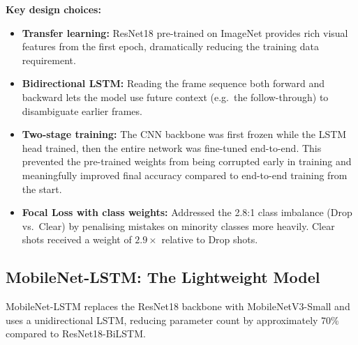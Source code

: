 \documentclass[11pt,a4paper]{article}
\begin{document}
\textbf{Key design choices:}
\begin{itemize}
  \item \textbf{Transfer learning:} ResNet18 pre-trained on ImageNet provides rich visual features from the first epoch, dramatically reducing the training data requirement.
  \item \textbf{Bidirectional LSTM:} Reading the frame sequence both forward and backward lets the model use future context (e.g.\ the follow-through) to disambiguate earlier frames.
  \item \textbf{Two-stage training:} The CNN backbone was first frozen while the LSTM head trained, then the entire network was fine-tuned end-to-end. This prevented the pre-trained weights from being corrupted early in training and meaningfully improved final accuracy compared to end-to-end training from the start.
  \item \textbf{Focal Loss with class weights:} Addressed the 2.8:1 class imbalance (Drop vs.\ Clear) by penalising mistakes on minority classes more heavily. Clear shots received a weight of $2.9\times$ relative to Drop shots.
\end{itemize}

\subsection{MobileNet-LSTM: The Lightweight Model}

MobileNet-LSTM replaces the ResNet18 backbone with MobileNetV3-Small and uses a unidirectional LSTM, reducing parameter count by approximately 70\% compared to ResNet18-BiLSTM.
\end{document}
